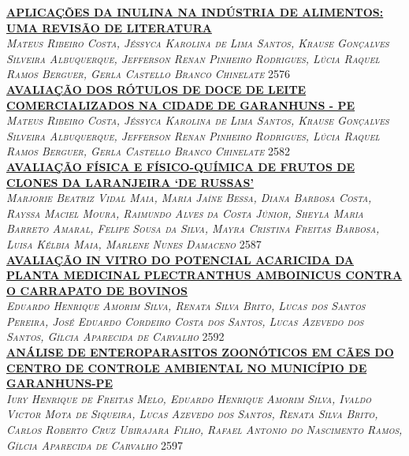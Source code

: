 \noindent \textsc{\hyperlink{trabalhos/251681.pdf.1}{\textbf{APLICAÇÕES DA INULINA NA INDÚSTRIA DE ALIMENTOS: UMA REVISÃO DE LITERATURA}}}\\ 
\noindent \textsc{\textit{Mateus Ribeiro Costa, Jéssyca Karolina de Lima Santos, Krause Gonçalves Silveira Albuquerque, Jefferson Renan Pinheiro Rodrigues, Lúcia Raquel Ramos Berguer, Gerla Castello Branco Chinelate}} \hfill 2576\\ 

\noindent \textsc{\hyperlink{trabalhos/251804.pdf.1}{\textbf{AVALIAÇÃO DOS RÓTULOS DE DOCE DE LEITE COMERCIALIZADOS NA CIDADE DE GARANHUNS - PE}}}\\ 
\noindent \textsc{\textit{Mateus Ribeiro Costa, Jéssyca Karolina de Lima Santos, Krause Gonçalves Silveira Albuquerque, Jefferson Renan Pinheiro Rodrigues, Lúcia Raquel Ramos Berguer, Gerla Castello Branco Chinelate}} \hfill 2582\\ 

\noindent \textsc{\hyperlink{trabalhos/251145.pdf.1}{\textbf{AVALIAÇÃO FÍSICA E FÍSICO-QUÍMICA DE FRUTOS DE CLONES DA LARANJEIRA ‘DE RUSSAS’}}}\\ 
\noindent \textsc{\textit{Marjorie Beatriz Vidal Maia, Maria Jaíne Bessa, Diana Barbosa Costa, Rayssa Maciel Moura, Raimundo Alves da Costa Júnior, Sheyla Maria Barreto Amaral, Felipe Sousa da Silva, Mayra Cristina Freitas Barbosa, Luisa Kélbia Maia, Marlene Nunes Damaceno}} \hfill 2587\\ 

\noindent \textsc{\hyperlink{trabalhos/248098.pdf.1}{\textbf{AVALIAÇÃO IN VITRO DO POTENCIAL ACARICIDA DA PLANTA MEDICINAL PLECTRANTHUS AMBOINICUS CONTRA O CARRAPATO DE BOVINOS}}}\\ 
\noindent \textsc{\textit{Eduardo Henrique Amorim Silva, Renata Silva Brito, Lucas dos Santos Pereira, José Eduardo Cordeiro Costa dos Santos, Lucas Azevedo dos Santos, Gílcia Aparecida de Carvalho}} \hfill 2592\\ 

\noindent \textsc{\hyperlink{trabalhos/249960.pdf.1}{\textbf{ANÁLISE DE ENTEROPARASITOS ZOONÓTICOS EM CÃES DO CENTRO DE CONTROLE AMBIENTAL NO MUNICÍPIO DE GARANHUNS-PE}}}\\ 
\noindent \textsc{\textit{Iury Henrique de Freitas Melo, Eduardo Henrique Amorim Silva, Ivaldo Victor Mota de Siqueira, Lucas Azevedo dos Santos, Renata Silva Brito, Carlos Roberto Cruz Ubirajara Filho, Rafael Antonio do Nascimento Ramos, Gílcia Aparecida de Carvalho}} \hfill 2597\\ 

